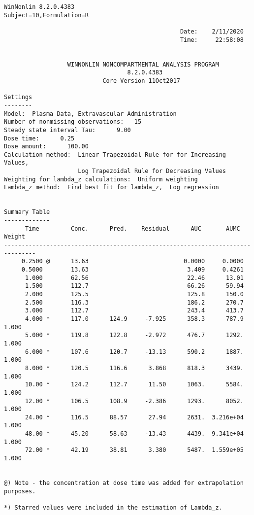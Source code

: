 \documentclass[12pt,a4paper]{article}
\begin{document}
\begin{verbatim}
WinNonlin 8.2.0.4383
Subject=10,Formulation=R

                                                  Date:    2/11/2020
                                                  Time:     22:58:08


                  WINNONLIN NONCOMPARTMENTAL ANALYSIS PROGRAM
                                   8.2.0.4383
                            Core Version 11Oct2017

Settings
--------
Model:  Plasma Data, Extravascular Administration
Number of nonmissing observations:   15
Steady state interval Tau:      9.00
Dose time:      0.25
Dose amount:      100.00
Calculation method:  Linear Trapezoidal Rule for for Increasing Values,
                     Log Trapezoidal Rule for Decreasing Values
Weighting for lambda_z calculations:  Uniform weighting
Lambda_z method:  Find best fit for lambda_z,  Log regression


Summary Table
-------------
      Time         Conc.      Pred.    Residual      AUC       AUMC      Weight
-------------------------------------------------------------------------------
     0.2500 @      13.63                           0.0000     0.0000
     0.5000        13.63                            3.409     0.4261
      1.000        62.56                            22.46      13.01
      1.500        112.7                            66.26      59.94
      2.000        125.5                            125.8      150.0
      2.500        116.3                            186.2      270.7
      3.000        112.7                            243.4      413.7
      4.000 *      117.0      124.9     -7.925      358.3      787.9      1.000
      5.000 *      119.8      122.8     -2.972      476.7      1292.      1.000
      6.000 *      107.6      120.7     -13.13      590.2      1887.      1.000
      8.000 *      120.5      116.6      3.868      818.3      3439.      1.000
      10.00 *      124.2      112.7      11.50      1063.      5584.      1.000
      12.00 *      106.5      108.9     -2.386      1293.      8052.      1.000
      24.00 *      116.5      88.57      27.94      2631.  3.216e+04      1.000
      48.00 *      45.20      58.63     -13.43      4439.  9.341e+04      1.000
      72.00 *      42.19      38.81      3.380      5487.  1.559e+05      1.000


@) Note - the concentration at dose time was added for extrapolation purposes.

*) Starred values were included in the estimation of Lambda_z.



\end{verbatim}
\end{document}
